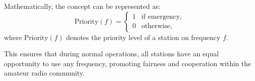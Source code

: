 Mathematically, the concept can be represented as:
\[
\text{Priority}(f) = 
\begin{cases}
1 & \text{if emergency,} \\
0 & \text{otherwise,}
\end{cases}
\]
where \( \text{Priority}(f) \) denotes the priority level of a station on frequency \( f \).

This ensures that during normal operations, all stations have an equal opportunity to use any frequency, promoting fairness and cooperation within the amateur radio community.

